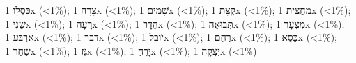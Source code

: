 \texthebrew{כִּסְלֵו} 1x (<1\%); \texthebrew{צָרָה} 1x (<1\%); \texthebrew{שָׁמַיִם} 1x (<1\%); \texthebrew{קְצָת} 1x (<1\%); \texthebrew{מַחֲצִית} 1x (<1\%); \texthebrew{שֵׁנִי} 1x (<1\%); \texthebrew{רָעָה} 1x (<1\%); \texthebrew{הָדָר} 1x (<1\%); \texthebrew{תְּבוּאָה} 1x (<1\%); \texthebrew{מִצְעָר} 1x (<1\%); \texthebrew{אַרְבַּע} 1x (<1\%); \texthebrew{דבר} 1x (<1\%); \texthebrew{יֹובֵל} 1x (<1\%); \texthebrew{רֶחֶם} 1x (<1\%); \texthebrew{כֶּסֶא} 1x (<1\%); \texthebrew{שַׁחַר} 1x (<1\%); \texthebrew{גֵּז} 1x (<1\%); \texthebrew{יָרֵחַ} 1x (<1\%); \texthebrew{יְצֻקָה} 1x (<1\%)%